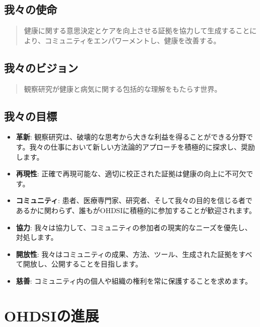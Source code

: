 \documentclass[
  11pt]{book}
\theoremstyle{definition}
\theoremstyle{definition}
\theoremstyle{definition}
\theoremstyle{definition}
\theoremstyle{remark}
\begin{document}
\subsection{我々の使命}\label{ux6211ux3005ux306eux4f7fux547d}

\begin{quote}
健康に関する意思決定とケアを向上させる証拠を協力して生成することにより、コミュニティをエンパワーメントし、健康を改善する。 
\end{quote}

\subsection{我々のビジョン}\label{ux6211ux3005ux306eux30d3ux30b8ux30e7ux30f3}

\begin{quote}
観察研究が健康と病気に関する包括的な理解をもたらす世界。 
\end{quote}

\subsection{我々の目標}\label{ux6211ux3005ux306eux76eeux6a19}

\begin{itemize}
\item
  \textbf{革新}: 観察研究は、破壊的な思考から大きな利益を得ることができる分野です。我々の仕事において新しい方法論的アプローチを積極的に探求し、奨励します。
\item
  \textbf{再現性}: 正確で再現可能な、適切に校正された証拠は健康の向上に不可欠です。
\item
  \textbf{コミュニティ}: 患者、医療専門家、研究者、そして我々の目的を信じる者であるかに関わらず、誰もがOHDSIに積極的に参加することが歓迎されます。 
\item
  \textbf{協力}: 我々は協力して、コミュニティの参加者の現実的なニーズを優先し、対処します。
\item
  \textbf{開放性}: 我々はコミュニティの成果、方法、ツール、生成された証拠をすべて開放し、公開することを目指します。
\item
  \textbf{慈善}: コミュニティ内の個人や組織の権利を常に保護することを求めます。 
\end{itemize}

\section{OHDSIの進展}\label{ohdsiux306eux9032ux5c55}
\end{document}
